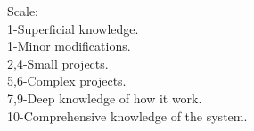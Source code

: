 \documentclass[A4]{deedy-resume} %
\begin{document}
\begin{minipage}[t]{0.32\textwidth}
\vspace*{0.5cm}

Scale:\\
\scriptsize 
1-Superficial knowledge.\\
1-Minor modifications.\\
2,4-Small projects.\\
5,6-Complex projects.\\
7,9-Deep knowledge of how it work.\\
10-Comprehensive knowledge of the system.

\sectionspace %






\end{minipage} %
\hfill
%
%
\end{document}
